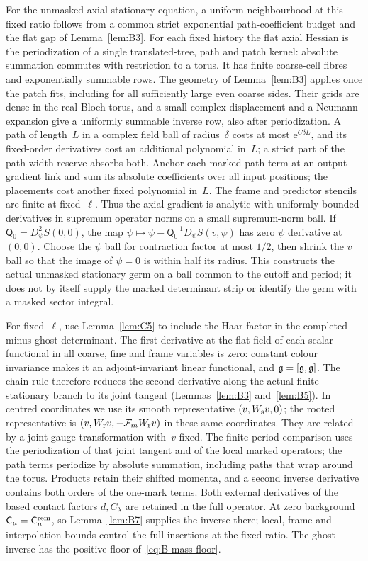 For the unmasked axial stationary equation, a uniform neighbourhood at this fixed ratio follows from a common strict exponential path-coefficient budget and the flat gap of Lemma~\ref{lem:B3}. For each fixed history the flat axial Hessian is the periodization of a single translated-tree, path and patch kernel: absolute summation commutes with restriction to a torus. It has finite coarse-cell fibres and exponentially summable rows. The geometry of Lemma~\ref{lem:B3} applies once the patch fits, including for all sufficiently large even coarse sides. Their grids are dense in the real Bloch torus, and a small complex displacement and a Neumann expansion give a uniformly summable inverse row, also after periodization. A path of length~$L$ in a complex field ball of radius~$\delta$ costs at most $\mathrm e^{C\delta L}$, and its fixed-order derivatives cost an additional polynomial in~$L$; a strict part of the path-width reserve absorbs both. Anchor each marked path term at an output gradient link and sum its absolute coefficients over all input positions; the placements cost another fixed polynomial in~$L$. The frame and predictor stencils are finite at fixed~$\ell$. Thus the axial gradient is analytic with uniformly bounded derivatives in supremum operator norms on a small supremum-norm ball. If $\mathsf Q_0=D_\psi^2S(0,0)$, the map $\psi\mapsto\psi-\mathsf Q_0^{-1}D_\psi S(v,\psi)$ has zero $\psi$ derivative at $(0,0)$. Choose the $\psi$ ball for contraction factor at most $1/2$, then shrink the $v$ ball so that the image of $\psi=0$ is within half its radius. This constructs the actual unmasked stationary germ on a ball common to the cutoff and period; it does not by itself supply the marked determinant strip or identify the germ with a masked sector integral.

For fixed~$\ell$, use Lemma~\ref{lem:C5} to include the Haar factor in the completed-minus-ghost determinant. The first derivative at the flat field of each scalar functional in all coarse, fine and frame variables is zero: constant colour invariance makes it an adjoint-invariant linear functional, and $\mathfrak{g}=[\mathfrak{g},\mathfrak{g}]$. The chain rule therefore reduces the second derivative along the actual finite stationary branch to its joint tangent (Lemmas~\ref{lem:B3} and~\ref{lem:B5}). In centred coordinates we use its smooth representative $(v,W_{\rm s}v,0)$; the rooted representative is $(v,W_{\rm r}v,-\mathcal F_mW_{\rm r}v)$ in these same coordinates. They are related by a joint gauge transformation with~$v$ fixed. The finite-period comparison uses the periodization of that joint tangent and of the local marked operators; the path terms periodize by absolute summation, including paths that wrap around the torus. Products retain their shifted momenta, and a second inverse derivative contains both orders of the one-mark terms. Both external derivatives of the based contact factors $d,C_\lambda$ are retained in the full operator. At zero background $\mathsf C_\mu=\mathsf C^{\rm rem}_\mu$, so Lemma~\ref{lem:B7} supplies the inverse there; local, frame and interpolation bounds control the full insertions at the fixed ratio. The ghost inverse has the positive floor of~\eqref{eq:B-mass-floor}.

